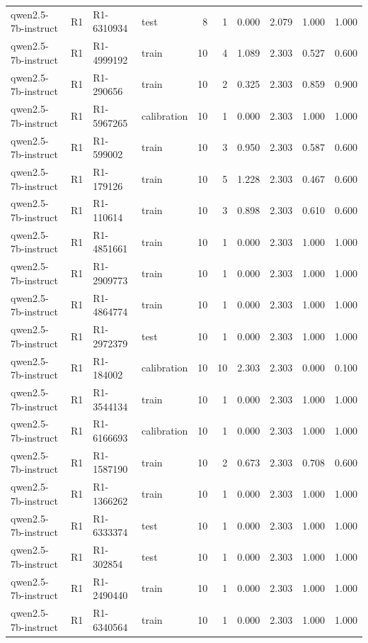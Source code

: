 \begin{table}
\begin{tabular}{llllrrrrrr}
qwen2.5-7b-instruct & R1 & R1-6310934 & test & 8 & 1 & 0.000 & 2.079 & 1.000 & 1.000 \\
qwen2.5-7b-instruct & R1 & R1-4999192 & train & 10 & 4 & 1.089 & 2.303 & 0.527 & 0.600 \\
qwen2.5-7b-instruct & R1 & R1-290656 & train & 10 & 2 & 0.325 & 2.303 & 0.859 & 0.900 \\
qwen2.5-7b-instruct & R1 & R1-5967265 & calibration & 10 & 1 & 0.000 & 2.303 & 1.000 & 1.000 \\
qwen2.5-7b-instruct & R1 & R1-599002 & train & 10 & 3 & 0.950 & 2.303 & 0.587 & 0.600 \\
qwen2.5-7b-instruct & R1 & R1-179126 & train & 10 & 5 & 1.228 & 2.303 & 0.467 & 0.600 \\
qwen2.5-7b-instruct & R1 & R1-110614 & train & 10 & 3 & 0.898 & 2.303 & 0.610 & 0.600 \\
qwen2.5-7b-instruct & R1 & R1-4851661 & train & 10 & 1 & 0.000 & 2.303 & 1.000 & 1.000 \\
qwen2.5-7b-instruct & R1 & R1-2909773 & train & 10 & 1 & 0.000 & 2.303 & 1.000 & 1.000 \\
qwen2.5-7b-instruct & R1 & R1-4864774 & train & 10 & 1 & 0.000 & 2.303 & 1.000 & 1.000 \\
qwen2.5-7b-instruct & R1 & R1-2972379 & test & 10 & 1 & 0.000 & 2.303 & 1.000 & 1.000 \\
qwen2.5-7b-instruct & R1 & R1-184002 & calibration & 10 & 10 & 2.303 & 2.303 & 0.000 & 0.100 \\
qwen2.5-7b-instruct & R1 & R1-3544134 & train & 10 & 1 & 0.000 & 2.303 & 1.000 & 1.000 \\
qwen2.5-7b-instruct & R1 & R1-6166693 & calibration & 10 & 1 & 0.000 & 2.303 & 1.000 & 1.000 \\
qwen2.5-7b-instruct & R1 & R1-1587190 & train & 10 & 2 & 0.673 & 2.303 & 0.708 & 0.600 \\
qwen2.5-7b-instruct & R1 & R1-1366262 & train & 10 & 1 & 0.000 & 2.303 & 1.000 & 1.000 \\
qwen2.5-7b-instruct & R1 & R1-6333374 & test & 10 & 1 & 0.000 & 2.303 & 1.000 & 1.000 \\
qwen2.5-7b-instruct & R1 & R1-302854 & test & 10 & 1 & 0.000 & 2.303 & 1.000 & 1.000 \\
qwen2.5-7b-instruct & R1 & R1-2490440 & train & 10 & 1 & 0.000 & 2.303 & 1.000 & 1.000 \\
qwen2.5-7b-instruct & R1 & R1-6340564 & train & 10 & 1 & 0.000 & 2.303 & 1.000 & 1.000 \\

\end{tabular}
\end{table}
